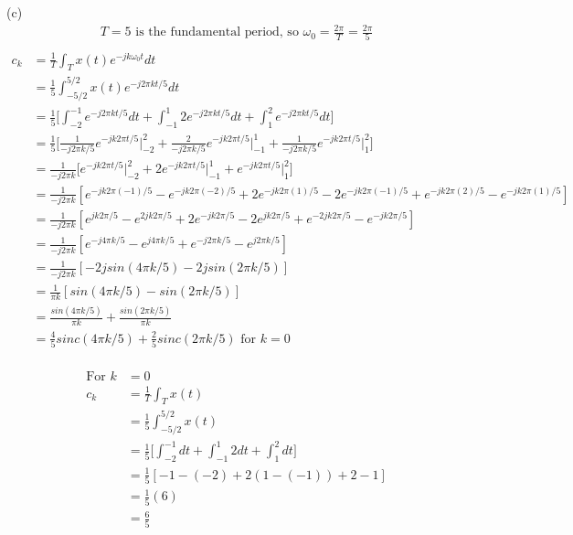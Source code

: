 \documentclass{article}
\begin{document}
\break
(c)\\
\begin{equation*}
\begin{split}
    T = 5 \text{ is the fundamental period, so } \omega_0 = \frac{2\pi}{T} = \frac{2\pi}{5}\\
\end{split}
\end{equation*}
\begin{equation*}
\begin{split}
    c_k &= \frac{1}{T} \int_T x(t)e^{-jk\omega_0t}dt\\  
    &= \frac{1}{5} \int_{-5/2}^{5/2} x(t) e^{-j 2 \pi kt/5}dt\\
    &= \frac{1}{5} \Big[\int_{-2}^{-1} e^{-j 2 \pi kt/5}dt + \int_{-1}^{1} 2e^{-j 2 \pi kt/5}dt + \int_{1}^{2} e^{-j 2 \pi kt/5}dt \Big]\\
    &= \frac{1}{5} \Big[\frac{1}{-j2\pi k/5}e^{-jk 2\pi t /5}\Big|_{-2}^{2} + \frac{2}{-j2\pi k/5}e^{-jk 2\pi t /5}\Big|_{-1}^{1} + \frac{1}{-j2\pi k/5}e^{-jk 2\pi t /5}\Big|_{1}^{2}\Big]\\
    &= \frac{1}{-j2\pi k} \Big[e^{-jk 2\pi t /5}\Big|_{-2}^{2} + 2e^{-jk 2\pi t /5}\Big|_{-1}^{1} + e^{-jk 2\pi t /5}\Big|_{1}^{2}\Big]\\
    &= \frac{1}{-j2\pi k} [ e^{-jk 2\pi (-1) /5} - e^{-jk 2\pi (-2) /5} + 2e^{-jk 2\pi (1) /5} - 2e^{-jk 2\pi (-1) /5} + e^{-jk 2\pi (2) /5} - e^{-jk 2\pi (1) /5} ]\\
    &= \frac{1}{-j2\pi k} [ e^{jk 2\pi /5} - e^{2jk 2\pi /5} + 2e^{-jk 2\pi /5} - 2e^{jk 2\pi /5} + e^{-2jk 2\pi /5} - e^{-jk 2\pi /5} ]\\
    &= \frac{1}{-j2\pi k} [ e^{-j4\pi k/5} - e^{j4\pi k/5} + e^{-j2\pi k/5} - e^{j2\pi k/5}]\\
    &= \frac{1}{-j2\pi k} [-2jsin(4 \pi k/5) - 2jsin(2 \pi k/5)]\\
    &= \frac{1}{\pi k} [sin(4 \pi k/5) - sin(2 \pi k/5)]\\
    &= \frac{sin(4 \pi k/5)}{\pi k} + \frac{sin(2 \pi k/5)}{\pi k}\\
    &= \frac{4}{5} sinc(4 \pi k/5) + \frac{2}{5} sinc(2 \pi k/5) \text{ for $k = 0$}\\
\end{split}
\end{equation*}

\begin{equation*}
\begin{split}
    \text{For } k &= 0\\
    c_k &= \frac{1}{T} \int_T x(t)\\  
    &= \frac{1}{5} \int_{-5/2}^{5/2} x(t)\\
    &= \frac{1}{5} \Big[ \int_{-2}^{-1}dt + \int_{-1}^{1}2dt + \int_{1}^{2}dt \Big]\\
    &= \frac{1}{5} [-1-(-2) + 2(1 - (-1)) + 2 - 1]\\
    &= \frac{1}{5}(6)\\
    &= \frac{6}{5}
\end{split}
\end{equation*}
\end{document}
